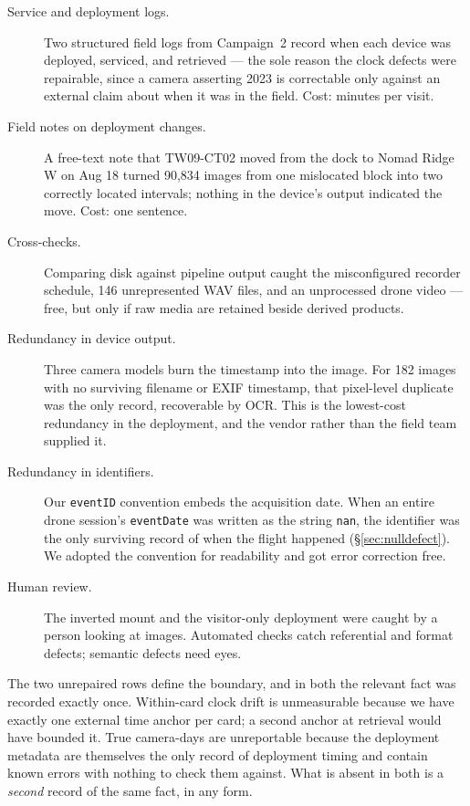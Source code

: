 \documentclass[sigconf]{acmart}
\begin{document}
\begin{description}
\item[Service and deployment logs.] Two structured field logs from
Campaign~2 record when each device was deployed, serviced, and
retrieved --- the sole reason the clock defects were repairable, since a
camera asserting 2023 is correctable only against an external claim
about when it was in the field. Cost: minutes per visit.

\item[Field notes on deployment changes.] A free-text note that
TW09-CT02 moved from the dock to Nomad Ridge W on Aug 18 turned
90{,}834 images from one mislocated block into two correctly located
intervals; nothing in the device's output indicated the move. Cost: one
sentence.

\item[Cross-checks.] Comparing disk against pipeline output caught the
misconfigured recorder schedule, 146 unrepresented WAV files, and an
unprocessed drone video --- free, but only if raw media are retained
beside derived products.

\item[Redundancy in device output.] Three camera models burn the
timestamp into the image. For 182 images with no surviving filename or
EXIF timestamp, that pixel-level duplicate was the only record,
recoverable by OCR. This is the lowest-cost redundancy in the
deployment, and the vendor rather than the field team supplied it.

\item[Redundancy in identifiers.] Our \texttt{eventID}
convention embeds the acquisition date. When an entire drone session's
\texttt{eventDate} was written as the string \texttt{nan}, the
identifier was the only surviving record of when the flight happened
(\S\ref{sec:nulldefect}). We adopted the convention for readability and
got error correction free.

\item[Human review.] The inverted mount and the visitor-only deployment
were caught by a person looking at images. Automated checks catch
referential and format defects; semantic defects need eyes.
\end{description}

The two unrepaired rows define the boundary, and in both the relevant
fact was recorded exactly once. Within-card clock drift is unmeasurable because
we have exactly one external time anchor per card; a second anchor at
retrieval would have bounded it. True camera-days are unreportable
because the deployment metadata are themselves the only record of
deployment timing and contain known errors with nothing to check them
against. What is absent in both is a \emph{second} record of the same
fact, in any form.
\end{document}
